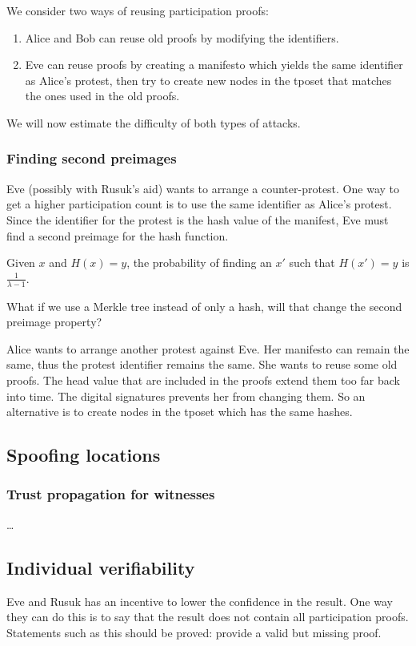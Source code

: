 We consider two ways of reusing participation proofs:
\begin{enumerate}
  \item Alice and Bob can reuse old proofs by modifying the identifiers.
  \item Eve can reuse proofs by creating a manifesto which yields the same 
    identifier as Alice's protest, then try to create new nodes in the 
    \ac{tposet} that matches the ones used in the old proofs.
\end{enumerate}
We will now estimate the difficulty of both types of attacks.

\subsubsection{Finding second preimages}

Eve (possibly with Rusuk's aid) wants to arrange a counter-protest.
One way to get a higher participation count is to use the same identifier as 
Alice's protest.
Since the identifier for the protest is the hash value of the manifest, Eve 
must find a second preimage for the hash function.

\begin{proposition}
  Given \(x\) and \(H(x) = y\), the probability of finding an \(x'\) such that 
  \(H(x') = y\) is \(\frac{1}{\lambda-1}\).
\end{proposition}

\begin{question}
  What if we use a Merkle tree instead of only a hash, will that change the 
  second preimage property?
\end{question}

Alice wants to arrange another protest against Eve.
Her manifesto can remain the same, thus the protest identifier remains the 
same.
She wants to reuse some old proofs.
The head value that are included in the proofs extend them too far back into 
time.
The digital signatures prevents her from changing them.
So an alternative is to create nodes in the \ac{tposet} which has the same 
hashes.

\subsection{Spoofing locations}

\subsubsection{Trust propagation for witnesses}

\dots

\subsection{Individual verifiability}

Eve and Rusuk has an incentive to lower the confidence in the result.
One way they can do this is to say that the result does not contain all 
participation proofs.
Statements such as this should be proved: provide a valid but missing proof.
